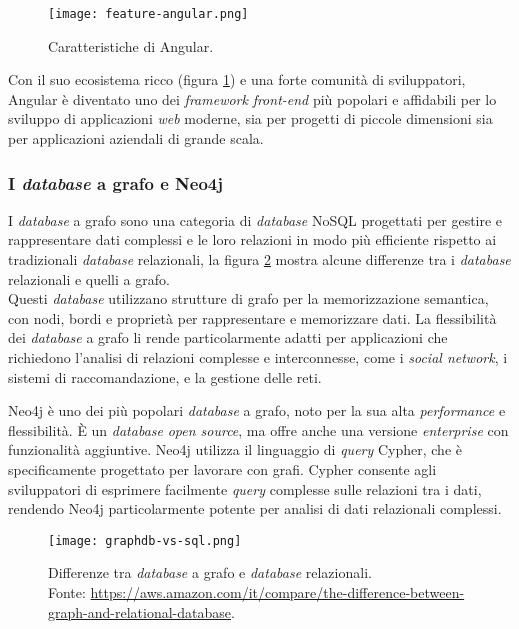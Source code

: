 \begin{figure}[h] 
  \centering 
  \texttt{[image: feature-angular.png]} 
  \caption{Caratteristiche di Angular.}
  \label{fig:feature-angular}
\end{figure}

Con il suo ecosistema ricco (figura \ref*{fig:feature-angular}) e una forte comunità di sviluppatori, Angular è diventato uno dei \textit{framework} \textit{front-end} più popolari e 
affidabili per lo sviluppo di applicazioni \textit{web} moderne, sia per progetti di piccole dimensioni sia per applicazioni aziendali di grande scala.

\subsubsection*{I \textit{database} a grafo e Neo4j}

I \textit{database} a grafo sono una categoria di \textit{database} NoSQL progettati per gestire e rappresentare dati complessi e le loro relazioni 
in modo più efficiente rispetto ai tradizionali \textit{database} relazionali, la figura \ref*{fig:graphdb-vs-sql} mostra alcune differenze tra i \textit{database} relazionali e quelli a grafo.\\
Questi \textit{database} utilizzano strutture di grafo per la memorizzazione 
semantica, con nodi, bordi e proprietà per rappresentare e memorizzare dati. La flessibilità dei \textit{database} a grafo li rende particolarmente 
adatti per applicazioni che richiedono l'analisi di relazioni complesse e interconnesse, come i \textit{social network}, i sistemi di raccomandazione, 
e la gestione delle reti.

Neo4j è uno dei più popolari \textit{database} a grafo, noto per la sua alta \textit{performance} e flessibilità. È un \textit{database} 
\textit{open source}, ma offre anche una versione \textit{enterprise} con funzionalità aggiuntive. Neo4j utilizza il linguaggio di 
\textit{query} Cypher, che è specificamente progettato per lavorare con grafi. Cypher consente agli sviluppatori di esprimere 
facilmente \textit{query} complesse sulle relazioni tra i dati, rendendo Neo4j particolarmente potente per analisi di dati relazionali complessi.

\begin{figure}[h] 
  \centering 
  \texttt{[image: graphdb-vs-sql.png]} 
  \caption[Differenze tra \textit{database} a grafo e \textit{database} relazionali.]{Differenze tra \textit{database} a grafo e \textit{database} relazionali. \\Fonte: \url{https://aws.amazon.com/it/compare/the-difference-between-graph-and-relational-database}.}
  \label{fig:graphdb-vs-sql}
\end{figure}

